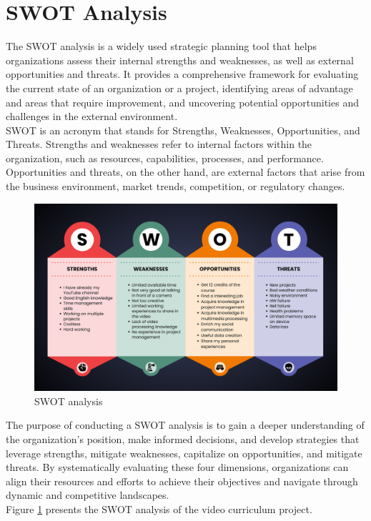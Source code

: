 \documentclass[eng]{class}
\begin{document}
\section{SWOT Analysis}
The SWOT analysis is a widely used strategic planning tool that helps organizations assess their internal strengths and weaknesses,
as well as external opportunities and threats. It provides a comprehensive framework for evaluating the current state of an organization or a project,
identifying areas of advantage and areas that require improvement, and uncovering potential opportunities and challenges in the external environment.\\
SWOT is an acronym that stands for Strengths, Weaknesses, Opportunities, and Threats. Strengths and weaknesses refer to internal factors within the organization,
such as resources, capabilities, processes, and performance. Opportunities and threats, on the other hand, are external factors that arise from the
business environment, market trends, competition, or regulatory changes.\\
\clearpage
\begin{figure}[t!]
  \centering
  \includegraphics[width=\textwidth]{images/SWOT.png}
  \caption{SWOT analysis}
  \label{fig-3}
\end{figure}
The purpose of conducting a SWOT analysis is to gain a deeper understanding of the organization's position,
make informed decisions, and develop strategies that leverage strengths, mitigate weaknesses, capitalize on opportunities,
and mitigate threats. By systematically evaluating these four dimensions, organizations can align their resources and efforts to achieve their
objectives and navigate through dynamic and competitive landscapes.\\
Figure \ref{fig-3} presents the SWOT analysis of the video curriculum project.
\end{document}
